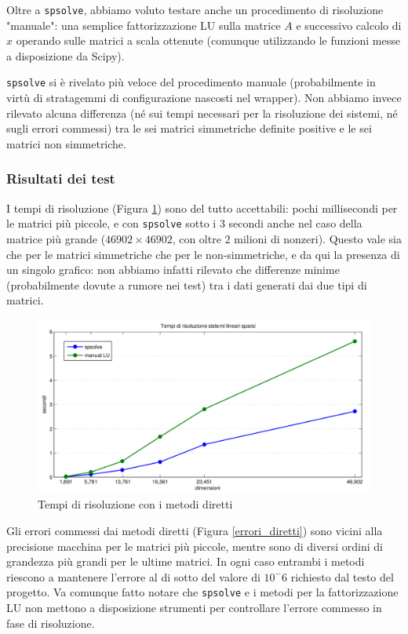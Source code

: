 \documentclass[11pt,a4paper]{scrartcl}
\begin{document}
Oltre a \texttt{spsolve}, abbiamo voluto testare anche un procedimento di risoluzione "manuale": una semplice fattorizzazione LU sulla matrice $A$ e successivo calcolo di $x$ operando sulle matrici a scala ottenute (comunque utilizzando le funzioni messe a disposizione da Scipy).

\texttt{spsolve} si è rivelato più veloce del procedimento manuale (probabilmente in virtù di stratagemmi di configurazione nascosti nel wrapper). Non abbiamo invece rilevato alcuna differenza (né sui tempi necessari per la risoluzione dei sistemi, né sugli errori commessi) tra le sei matrici simmetriche definite positive e le sei matrici non simmetriche. 

\subsubsection*{Risultati dei test}

I tempi di risoluzione (Figura \ref{tempi_diretti}) sono del tutto accettabili: pochi millisecondi per le matrici più piccole, e con \texttt{spsolve} sotto i 3 secondi anche nel caso della matrice più grande ($46902 \times 46902$, con oltre 2 milioni di nonzeri). Questo vale sia che per le matrici simmetriche che per le non-simmetriche, e da qui la presenza di un singolo grafico: non abbiamo infatti rilevato che differenze minime (probabilmente dovute a rumore nei test) tra i dati generati dai due tipi di matrici.

\begin{figure}[!ht]
\centering
\includegraphics[scale=0.50]{images/tempi_diretti} 
\caption{Tempi di risoluzione con i metodi diretti}
\label{tempi_diretti}
\end{figure}

Gli errori commessi dai metodi diretti (Figura \ref{errori_diretti}) sono vicini alla precisione macchina per le matrici più piccole, mentre sono di diversi ordini di grandezza più grandi per le ultime matrici. In ogni caso entrambi i metodi riescono a mantenere l'errore al di sotto del valore di $10^-6$ richiesto dal testo del progetto. Va comunque fatto notare che \texttt{spsolve} e i metodi per la fattorizzazione LU non mettono a disposizione strumenti per controllare l'errore commesso in fase di risoluzione.
\end{document}
